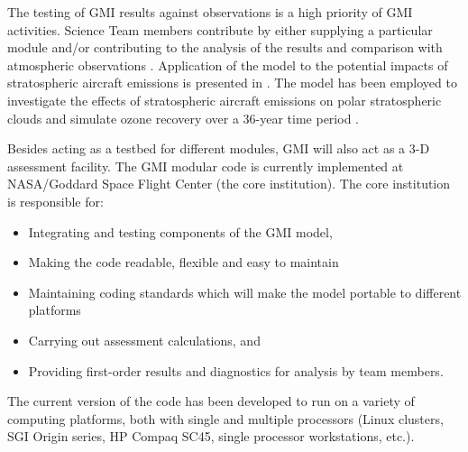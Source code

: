 The testing of GMI results against observations is a high priority
of GMI activities. Science Team members contribute by either
supplying a particular module and/or contributing to the analysis
of the results and comparison with atmospheric observations
\cite{Douglass-etal99, Rotman-etal01, Strahan-Duncan-Hoor07, Meskhidze-etal07}. 
Application of the model to the potential impacts of
stratospheric aircraft emissions is presented in \cite{Kinnison-etal01}. 
The model has been employed to investigate the effects of stratospheric aircraft
emissions on polar stratospheric clouds \cite{Considine-etal00} and simulate
ozone recovery over a 36-year time period \cite{Considine-etal04}.

Besides acting as a testbed for different modules, GMI will also
act as a 3-D assessment facility. The GMI modular code is currently
implemented at NASA/Goddard Space Flight Center (the core institution).
The core institution is responsible for: 
%
\begin{itemize}
\item Integrating and testing components of the GMI model, 
\item Making the code readable, flexible and easy to maintain
\item Maintaining coding standards which will make the model 
      portable to different platforms
\item Carrying out assessment calculations, and 
\item Providing first-order results and diagnostics for 
      analysis by team members. 
\end{itemize}
%
The current  version of the code has been developed to run on a variety of 
computing platforms, both with single and multiple processors 
(Linux clusters, SGI Origin series, HP Compaq SC45, 
single processor workstations, etc.).

